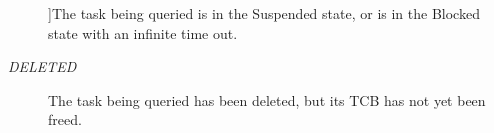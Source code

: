 \begin{Desc}
\begin{description}
{}]The task being queried is in the Suspended state, or is in the Blocked state with an infinite time out. \item[{\em 
\hypertarget{group___enumerations_gga25ee4013cc565a18ac2f4039b4ad441baae88752b9379248f07e2c3fdc064d998}{D\-E\-L\-E\-T\-E\-D}\label{group___enumerations_gga25ee4013cc565a18ac2f4039b4ad441baae88752b9379248f07e2c3fdc064d998}
}]The task being queried has been deleted, but its T\-C\-B has not yet been freed. \end{description}
\end{Desc}
